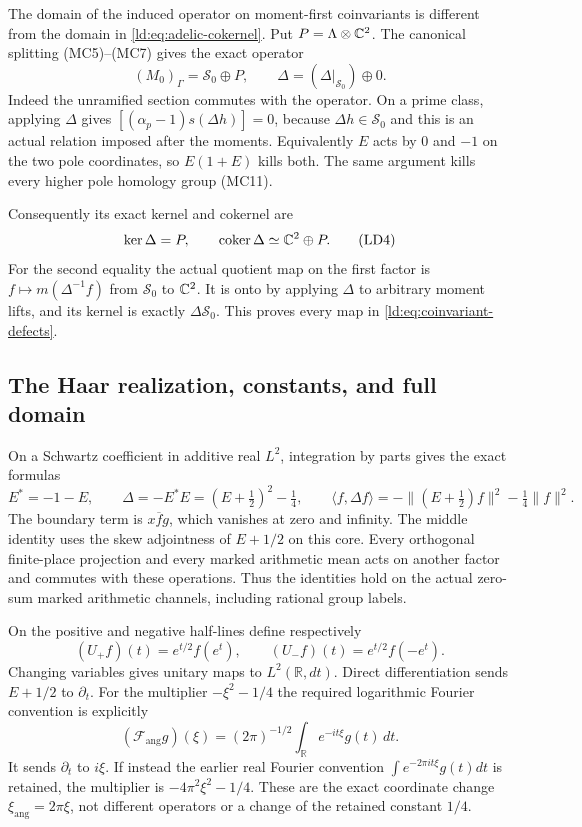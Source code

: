 The domain of the induced operator on moment-first coinvariants
is different from the domain in \eqref{ld:eq:adelic-cokernel}.
Put $P=\Lambda\otimes\mathbb C^2$. The canonical splitting (MC5)--(MC7)
gives the exact operator
\[
 (M_0)_\Gamma=\mathscr S_0\oplus P,
 \qquad \Delta=(\Delta|_{\mathscr S_0})\oplus0.
 \tag{LD3}\label{ld:eq:coinvariant-operator}
\]
Indeed the unramified section commutes with the operator. On a
prime class, applying $\Delta$ gives
$[(\alpha_p-1)s(\Delta h)]=0$, because $\Delta h\in\mathscr S_0$
and this is an actual relation imposed after the moments.
Equivalently $E$ acts by $0$ and $-1$ on the two pole coordinates,
so $E(1+E)$ kills both. The same argument kills every higher pole
homology group (MC11).

Consequently its exact kernel and cokernel are
\[
 \ker\Delta=P,\qquad
 \operatorname{coker}\Delta\simeq\mathbb C^2\oplus P.
 \tag{LD4}\label{ld:eq:coinvariant-defects}
\]
For the second equality the actual quotient map on the first
factor is $f\mapsto m(\Delta^{-1}f)$ from $\mathscr S_0$ to
$\mathbb C^2$. It is onto by applying $\Delta$ to arbitrary moment
lifts, and its kernel is exactly $\Delta\mathscr S_0$.
This proves every map in \eqref{ld:eq:coinvariant-defects}.

\subsection{The Haar realization, constants, and full domain}

On a Schwartz coefficient in additive real $L^2$, integration
by parts gives the exact formulas
\[
 E^*=-1-E,\qquad
 \Delta=-E^*E=(E+\tfrac12)^2-\tfrac14,
 \qquad
 \langle f,\Delta f\rangle
     =-\|(E+\tfrac12)f\|^2-\tfrac14\|f\|^2.
 \tag{LD5}\label{ld:eq:haar-sign}
\]
The boundary term is $x\overline f g$, which vanishes at zero
and infinity. The middle identity uses the skew adjointness of
$E+1/2$ on this core. Every orthogonal finite-place projection
and every marked arithmetic mean acts on another factor and
commutes with these operations. Thus the identities hold on the
actual zero-sum marked arithmetic channels, including rational
group labels.

On the positive and negative half-lines define respectively
\[
 (U_+f)(t)=e^{t/2}f(e^t),\qquad
 (U_-f)(t)=e^{t/2}f(-e^t).
 \tag{LD6}\label{ld:eq:log-map}
\]
Changing variables gives unitary maps to $L^2(\mathbb R,dt)$.
Direct differentiation sends $E+1/2$ to $\partial_t$.
For the multiplier $-\xi^2-1/4$ the required logarithmic Fourier
convention is explicitly
\[
 (\mathcal F_{\mathrm{ang}}g)(\xi)
    =(2\pi)^{-1/2}\int_{\mathbb R}e^{-it\xi}g(t)\,dt.
 \tag{LD7}\label{ld:eq:angular-fourier}
\]
It sends $\partial_t$ to $i\xi$. If instead the earlier real
Fourier convention $\int e^{-2\pi it\xi}g(t)dt$ is retained,
the multiplier is $-4\pi^2\xi^2-1/4$. These are the exact
coordinate change $\xi_{\mathrm{ang}}=2\pi\xi$, not different
operators or a change of the retained constant $1/4$.

